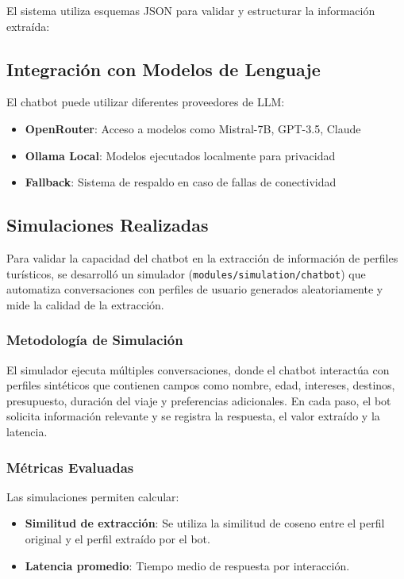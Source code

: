 \documentclass[runningheads]{llncs}
\begin{document}
El sistema utiliza esquemas JSON para validar y estructurar la información extraída:


\subsection{Integración con Modelos de Lenguaje}

El chatbot puede utilizar diferentes proveedores de LLM:

\begin{itemize}
\item \textbf{OpenRouter}: Acceso a modelos como Mistral-7B, GPT-3.5, Claude
\item \textbf{Ollama Local}: Modelos ejecutados localmente para privacidad
\item \textbf{Fallback}: Sistema de respaldo en caso de fallas de conectividad
\end{itemize}

\subsection{Simulaciones Realizadas}

Para validar la capacidad del chatbot en la extracción de información de perfiles turísticos, se desarrolló un simulador (\texttt{modules/simulation/chatbot}) que automatiza conversaciones con perfiles de usuario generados aleatoriamente y mide la calidad de la extracción.

\subsubsection{Metodología de Simulación}

El simulador ejecuta múltiples conversaciones, donde el chatbot interactúa con perfiles sintéticos que contienen campos como nombre, edad, intereses, destinos, presupuesto, duración del viaje y preferencias adicionales. En cada paso, el bot solicita información relevante y se registra la respuesta, el valor extraído y la latencia.

\subsubsection{Métricas Evaluadas}

Las simulaciones permiten calcular:
\begin{itemize}
    \item \textbf{Similitud de extracción}: Se utiliza la similitud de coseno entre el perfil original y el perfil extraído por el bot.
    \item \textbf{Latencia promedio}: Tiempo medio de respuesta por interacción.

\end{itemize}
\end{document}
